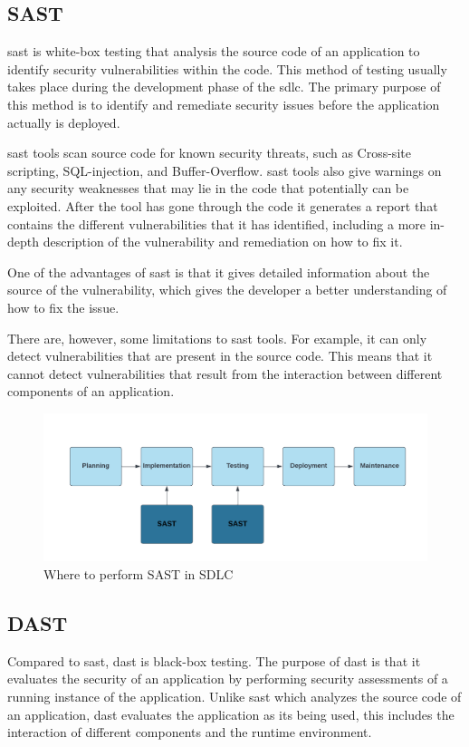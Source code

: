 \subsection{SAST}
\acrlong{sast} is white-box testing that analysis the source code of an application to identify security vulnerabilities within the code. This method of testing usually takes place during the development phase of the \acrlong{sdlc}. The primary purpose of this method is to identify and remediate security issues before the application actually is deployed. \cite{sast}

\acrshort{sast} tools scan source code for known security threats, such as \gls{Cross-site scripting}, \gls{SQL-injection}, and \gls{Buffer-Overflow}. \acrshort{sast} tools also give warnings on any security weaknesses that may lie in the code that potentially can be exploited. After the tool has gone through the code it generates a report that contains the different vulnerabilities that it has identified, including a more in-depth description of the vulnerability and remediation on how to fix it. 

One of the advantages of \acrshort{sast} is that it gives detailed information about the source of the vulnerability, which gives the developer a better understanding of how to fix the issue. 

There are, however, some limitations to \acrshort{sast} tools. For example, it can only detect vulnerabilities that are present in the source code. This means that it cannot detect vulnerabilities that result from the interaction between different components of an application.
\\
\begin{figure}[H]
    \centering
    \includegraphics[width=0.8\columnwidth]{Images/sast.png}
    \caption{Where to perform SAST in SDLC}
    \label{fig: Performance of SAST in SDLC}
\end{figure}


\subsection{DAST}
Compared to \acrshort{sast}, \acrlong{dast} is black-box testing. The purpose of \acrshort{dast} is that it evaluates the security of an application by performing security assessments of a running instance of the application. Unlike \acrshort{sast} which analyzes the source code of an application, \acrshort{dast} evaluates the application as its being used, this includes the interaction of different components and the runtime environment. 

